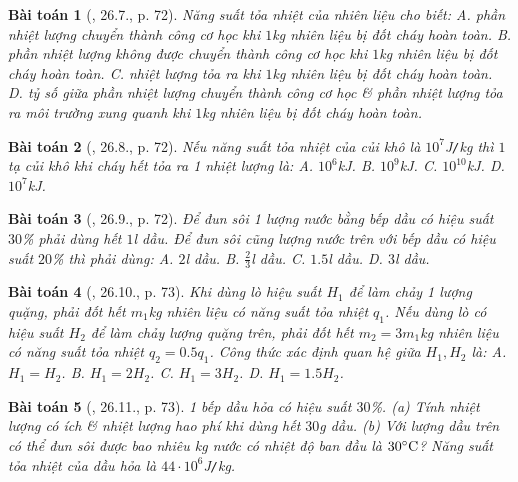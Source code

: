\documentclass{article}
\newtheorem{baitoan}{Bài toán}
\begin{document}
\begin{baitoan}[\cite{SBT_Vat_Ly_8}, 26.7., p. 72]
	Năng suất tỏa nhiệt của nhiên liệu cho biết: {\sf A.} phần nhiệt lượng chuyển thành công cơ học khi $1$\emph{kg} nhiên liệu bị đốt cháy hoàn toàn. {\sf B.} phần nhiệt lượng không được chuyển thành công cơ học khi $1$\emph{kg} nhiên liệu bị đốt cháy hoàn toàn. {\sf C.} nhiệt lượng tỏa ra khi $1$\emph{kg} nhiên liệu bị đốt cháy hoàn toàn. {\sf D.} tỷ số giữa phần nhiệt lượng chuyển thành công cơ học \& phần nhiệt lượng tỏa ra môi trường xung quanh khi $1$\emph{kg} nhiên liệu bị đốt cháy hoàn toàn.
\end{baitoan}

\begin{baitoan}[\cite{SBT_Vat_Ly_8}, 26.8., p. 72]
	Nếu năng suất tỏa nhiệt của củi khô là $10^7$\emph{J\texttt{/}kg} thì $1$ tạ củi khô khi cháy hết tỏa ra 1 nhiệt lượng là: {\sf A.} $10^6$\emph{kJ}. {\sf B.} $10^9$\emph{kJ}. {\sf C.} $10^{10}$\emph{kJ}. {\sf D.} $10^7$\emph{kJ}.
\end{baitoan}

\begin{baitoan}[\cite{SBT_Vat_Ly_8}, 26.9., p. 72]
	Để đun sôi 1 lượng nước bằng bếp dầu có hiệu suất $30$\% phải dùng hết $1$\emph{l} dầu. Để đun sôi cũng lượng nước trên với bếp dầu có hiệu suất $20$\% thì phải dùng: {\sf A.} $2$\emph{l} dầu. {\sf B.} $\frac{2}{3}$\emph{l} dầu. {\sf C.} $1.5$\emph{l} dầu. {\sf D.} $3$\emph{l} dầu.
\end{baitoan}

\begin{baitoan}[\cite{SBT_Vat_Ly_8}, 26.10., p. 73]
	Khi dùng lò hiệu suất $H_1$ để làm chảy 1 lượng quặng, phải đốt hết $m_1$\emph{kg} nhiên liệu có năng suất tỏa nhiệt $q_1$. Nếu dùng lò có hiệu suất $H_2$ để làm chảy lượng quặng trên, phải đốt hết $m_2 = 3m_1$\emph{kg} nhiên liệu có năng suất tỏa nhiệt $q_2 = 0.5q_1$. Công thức xác định quan hệ giữa $H_1,H_2$ là: {\sf A.} $H_1 = H_2$. {\sf B.} $H_1 = 2H_2$. {\sf C.} $H_1 = 3H_2$. {\sf D.} $H_1 = 1.5H_2$.
\end{baitoan}

\begin{baitoan}[\cite{SBT_Vat_Ly_8}, 26.11., p. 73]
	1 bếp dầu hỏa có hiệu suất $30$\%. (a) Tính nhiệt lượng có ích \& nhiệt lượng hao phí khi dùng hết $30$\emph{g} dầu. (b) Với lượng dầu trên có thể đun sôi được bao nhiêu \emph{kg} nước có nhiệt độ ban đầu là $30^\circ{\rm C}$? Năng suất tỏa nhiệt của dầu hỏa là $44\cdot10^6$\emph{J\texttt{/}kg}.
\end{baitoan}
\end{document}
